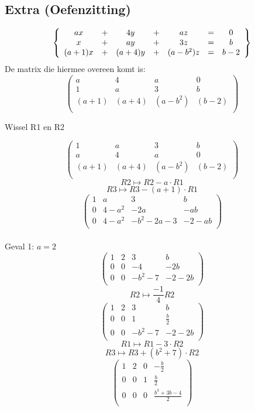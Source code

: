 \documentclass[lineaire_algebra_oplossingen.tex]{subfiles}
\begin{document}
\subsection{Extra (Oefenzitting)}
\[
\left\lbrace
\begin{array}{c c c c c c c}
ax &+& 4y &+& az &=& 0\\
x  &+& ay &+& 3z &=& b\\
(a+1)x &+& (a+4)y &+& (a-b^{2})z &=& b-2
\end{array}
\right\rbrace
\]
De matrix die hiermee overeen komt is:
\[
\begin{pmatrix}
a & 4 & a & 0\\
1 & a & 3 & b\\
(a+1) & (a+4) & (a-b^{2}) & (b-2)\\
\end{pmatrix}
\]
\begin{center}
Wissel R1 en R2
\end{center}
\[
\begin{pmatrix}
1 & a & 3 & b\\
a & 4 & a & 0\\
(a+1) & (a+4) & (a-b^{2}) & (b-2)\\
\end{pmatrix}
\]
\[ R2 \longmapsto R2 - a\cdot R1 \]
\[ R3 \longmapsto R3 - (a+1)\cdot R1 \]
\[
\begin{pmatrix}
1 & a & 3 & b\\
0 & 4-a^{2} & -2a & -ab\\
0 & 4-a^{2} & -b^{2}-2a-3 & -2-ab\\
\end{pmatrix}
\]
\\Geval 1: $a=2$
\[
\begin{pmatrix}
1 & 2 & 3 & b\\
0 & 0 & -4 & -2b\\
0 & 0 & -b^{2}-7 & -2-2b\\
\end{pmatrix}
\]
\[ R2 \longmapsto \frac{-1}{4}R2 \]
\[
\begin{pmatrix}
1 & 2 & 3 & b\\
0 & 0 & 1 & \frac{b}{2}\\
0 & 0 & -b^{2}-7 & -2-2b\\
\end{pmatrix}
\]
\[ R1 \longmapsto R1 - 3\cdot R2 \]
\[ R3 \longmapsto R3 + (b^{2}+7)\cdot R2 \]
\[
\begin{pmatrix}
1 & 2 & 0 & -\frac{b}{2}\\
0 & 0 & 1 & \frac{b}{2}\\
0 & 0 & 0 & \frac{b^{3}+3b-4}{2}\\
\end{pmatrix}
\]
\end{document}
